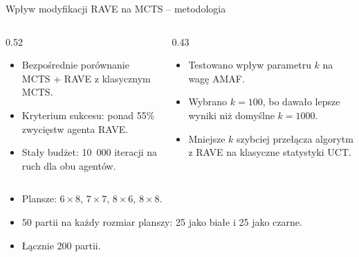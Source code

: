 \documentclass[10pt, aspectratio=169]{beamer}
\begin{document}
\begin{frame}{Wpływ modyfikacji RAVE na MCTS -- metodologia}
    \begin{columns}[T]
    \begin{column}{0.52\textwidth}
        \vspace{0.1cm}
        \begin{itemize}
            \item Bezpośrednie porównanie MCTS + RAVE z klasycznym MCTS.
            \item Kryterium sukcesu: ponad 55\% zwycięstw agenta RAVE.
            \item Stały budżet: 10~000 iteracji na ruch dla obu agentów.
        \end{itemize}
    \end{column}

    \begin{column}{0.43\textwidth}
        \vspace{0.1cm}
        \begin{itemize}
            \item Testowano wpływ parametru $k$ na wagę AMAF.
            \item Wybrano $k=100$, bo dawało lepsze wyniki niż domyślne $k=1000$.
            \item Mniejsze $k$ szybciej przełącza algorytm z RAVE na klasyczne statystyki UCT.
        \end{itemize}
    \end{column}
    \end{columns}

    \vspace{0.35cm}

    \begin{itemize}
        \item Plansze: $6 \times 8$, $7 \times 7$, $8 \times 6$, $8 \times 8$.
        \item 50 partii na każdy rozmiar planszy: 25 jako białe i 25 jako czarne.
        \item Łącznie 200 partii.
    \end{itemize}
\end{frame}
\end{document}
